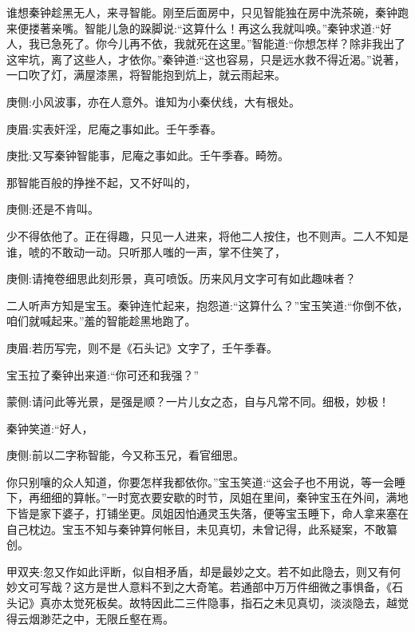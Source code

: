 \begin{parag}
    谁想秦钟趁黑无人，来寻智能。刚至后面房中，只见智能独在房中洗茶碗，秦钟跑来便搂著亲嘴。智能儿急的跺脚说:“这算什么！再这么我就叫唤。”秦钟求道:“好人，我已急死了。你今儿再不依，我就死在这里。”智能道:“你想怎样？除非我出了这牢坑，离了这些人，才依你。”秦钟道:“这也容易，只是远水救不得近渴。”说著，一口吹了灯，满屋漆黑，将智能抱到炕上，就云雨起来。\begin{note}庚侧:小风波事，亦在人意外。谁知为小秦伏线，大有根处。\end{note}\begin{note}庚眉:实表奸淫，尼庵之事如此。壬午季春。\end{note}\begin{note}庚批:又写秦钟智能事，尼庵之事如此。壬午季春。畸笏。\end{note}那智能百般的挣挫不起，又不好叫的，\begin{note}庚侧:还是不肯叫。\end{note}少不得依他了。正在得趣，只见一人进来，将他二人按住，也不则声。二人不知是谁，唬的不敢动一动。只听那人嗤的一声，掌不住笑了，\begin{note}庚侧:请掩卷细思此刻形景，真可喷饭。历来风月文字可有如此趣味者？\end{note}二人听声方知是宝玉。秦钟连忙起来，抱怨道:“这算什么？”宝玉笑道:“你倒不依，咱们就喊起来。”羞的智能趁黑地跑了。\begin{note}庚眉:若历写完，则不是《石头记》文字了，壬午季春。\end{note}宝玉拉了秦钟出来道:“你可还和我强？”\begin{note}蒙侧:请问此等光景，是强是顺？一片儿女之态，自与凡常不同。细极，妙极！\end{note}秦钟笑道:“好人，\begin{note}庚侧:前以二字称智能，今又称玉兄，看官细思。\end{note}你只别嚷的众人知道，你要怎样我都依你。”宝玉笑道:“这会子也不用说，等一会睡下，再细细的算帐。”一时宽衣要安歇的时节，凤姐在里间，秦钟宝玉在外间，满地下皆是家下婆子，打铺坐更。凤姐因怕通灵玉失落，便等宝玉睡下，命人拿来塞在自己枕边。宝玉不知与秦钟算何帐目，未见真切，未曾记得，此系疑案，不敢纂创。\begin{note}甲双夹:忽又作如此评断，似自相矛盾，却是最妙之文。若不如此隐去，则又有何妙文可写哉？这方是世人意料不到之大奇笔。若通部中万万件细微之事惧备，《石头记》真亦太觉死板矣。故特因此二三件隐事，指石之未见真切，淡淡隐去，越觉得云烟渺茫之中，无限丘壑在焉。\end{note}
\end{parag}


